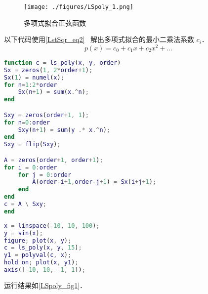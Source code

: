 

\begin{figure}[ht]
\centering
\texttt{[image: ./figures/LSpoly\_1.png]}
\caption{多项式拟合正弦函数} \label{LSpoly_fig1}
\end{figure}

以下代码使用\autoref{LstSqr_eq2}~ 解出多项式拟合的最小二乘法系数 $c_i$．
\begin{equation}
p(x) = c_0 + c_1 x + c_2 x^2 + \dots
\end{equation}

\begin{lstlisting}[language=matlab, caption=ls_poly.m]
% c = [..., c2, c1, c0]
function c = ls_poly(x, y, order)
Sx = zeros(1, 2*order+1);
Sx(1) = numel(x);
for n=1:2*order
    Sx(n+1) = sum(x.^n);
end

Sxy = zeros(order+1, 1);
for n=0:order
    Sxy(n+1) = sum(y .* x.^n);
end
Sxy = flip(Sxy);

A = zeros(order+1, order+1);
for i = 0:order
    for j = 0:order
        A(order-i+1,order-j+1) = Sx(i+j+1);
    end
end
c = A \ Sxy;
end
\end{lstlisting}

\begin{lstlisting}[language=matlab]
% ls_poly_demo
x = linspace(-10, 10, 100);
y = sin(x);
figure; plot(x, y);
c = ls_poly(x, y, 15);
y1 = polyval(c, x);
hold on; plot(x, y1);
axis([-10, 10, -1, 1]);
\end{lstlisting}
运行结果如\autoref{LSpoly_fig1}．
